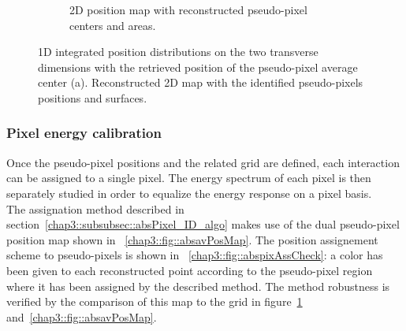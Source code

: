 \begin{figure}
\begin{subfigure}[t]{0.5\textwidth}
\caption{2D position map with reconstructed pseudo-pixel centers and areas.}
\label{chap3::fig::absfloodWithPix}
\end{subfigure}
\caption{1D integrated position distributions on the two transverse dimensions with the retrieved position of the pseudo-pixel average center (a). Reconstructed 2D map with the identified pseudo-pixels positions and surfaces.}
\label{chap3::fig::abspixID_analysis}
\end{figure}

\subsubsection{Pixel energy calibration}\label{chap3::subsubsec::absPixelEcal}

Once the pseudo-pixel positions and the related grid are defined, each interaction can be assigned to a single pixel. The energy spectrum of each pixel is then separately studied in order to equalize the energy response on a pixel basis.\\
The assignation method described in section~\ref{chap3::subsubsec::absPixel_ID_algo} makes use of the dual pseudo-pixel position map shown in \figurename~\ref{chap3::fig::absavPosMap}. 
The position assignement scheme to pseudo-pixels is shown in \figurename~\ref{chap3::fig::abspixAssCheck}: a color has been given to each reconstructed point according to the pseudo-pixel region where it has been assigned by the described method. The method robustness is verified by the comparison of this map to the grid in figure~\ref{chap3::fig::absfloodWithPix} and~\ref{chap3::fig::absavPosMap}.   


